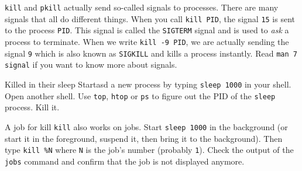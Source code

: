 \documentclass{TheAlternativeCourse}
\begin{document}
\texttt{kill} and \texttt{pkill} actually send so-called signals to processes. There are many signals that all do different things. When you call \texttt{kill PID}, the signal \texttt{15} is sent to the process \texttt{PID}. This signal is called the \texttt{SIGTERM} signal and is used to \emph{ask} a process to terminate. When we write \texttt{kill -9 PID}, we are actually sending the signal \texttt{9} which is also known as \texttt{SIGKILL} and kills a process instantly. Read \texttt{man 7 signal} if you want to know more about signals.


\begin{exercisebox}{Killed in their sleep}
	Startasd a new process by typing \texttt{sleep 1000} in your shell. Open another shell. Use \texttt{top}, \texttt{htop} or \texttt{ps} to figure out the PID of the \texttt{sleep} process. Kill it.
\end{exercisebox}

\begin{exercisebox}{A job for kill}
	\texttt{kill} also works on jobs. Start \texttt{sleep 1000} in the background (or start it in the foreground, suspend it, then bring it to the background). Then type \texttt{kill \%N} where \texttt{N} is the job's number (probably \texttt{1}). Check the output of the \texttt{jobs} command and confirm that the job is not displayed anymore.
\end{exercisebox}
\end{document}
